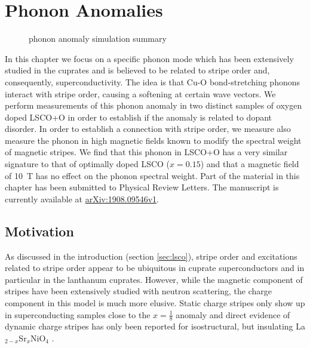 \newcommand{\LSCO}{La$_{2-x}$Sr$_{x}$CuO$_4$}
\newcommand{\LSCOOsix}{La$_{1.94}$Sr$_{0.06}$CuO$_{4+\delta}$}
\newcommand{\LSCOO}{La$_{2-x}$Sr$_{x}$CuO$_{4+\delta}$}
\newcommand{\LCOO}{La$_2$CuO$_{4+\delta}$}
\newcommand{\LNSCO}{La$_{1.48}$Nd$_{0.4}$Sr$_{0.12}$CuO$_4$}
\newcommand{\LSCOTwenty}{La$_{1.80}$Sr$_{0.20}$CuO$_4$}
\newcommand{\LSCOopt}{La$_{1.85}$Sr$_{0.15}$CuO$_4$}
\newcommand{\LSCOseven}{La$_{1.93}$Sr$_{0.07}$CuO$_4$}
\newcommand{\LSCOTwentyfive}{La$_{1.75}$Sr$_{0.25}$CuO$_4$}
\newcommand{\HBCOO}{HgBa$_2$CuO$_{4+\delta}$}
\newcommand{\LBCO}{La$_{2-x}$Ba$_x$CuO$_4$}
\newcommand{\LBCOtwelve}{La$_{1.875}$Ba$_{0.125}$CuO$_4$}
\newcommand{\LCO}{La$_2$CuO$_4$}
\newcommand{\Tc}{$T_\text{c}$}

\chapter{Phonon Anomalies}\label{ch:anomaly}

\begin{figure}
    \centering
    \caption{phonon anomaly simulation summary}
    \label{fig:phonon_anomaly_simulation_summary}
\end{figure}

In this chapter we focus on a specific phonon mode which has been extensively studied in the cuprates and is believed to be related to stripe order and, consequently, superconductivity. The idea is that Cu-O bond-stretching phonons interact with stripe order, causing a softening at certain wave vectors. We perform measurements of this phonon anomaly in two distinct samples of oxygen doped LSCO+O in order to establish if the anomaly is related to dopant disorder. In order to establish a connection with stripe order, we measure also measure the  phonon in high magnetic fields known to modify the spectral weight of magnetic stripes. We find that this phonon in LSCO+O has a very similar signature to that of optimally doped LSCO ($x=0.15$) and that a magnetic field of \SI{10}{\tesla} has no effect on the phonon spectral weight. Part of the material in this chapter has been submitted to Physical Review Letters. The manuscript is currently available at \href{https://arxiv.org/abs/1908.09546v1}{arXiv:1908.09546v1}.

\section{Motivation}
As discussed in the introduction (section \ref{sec:lsco}), stripe order and excitations related to stripe order appear to be ubiquitous in cuprate superconductors and in particular in the lanthanum cuprates. However, while the magnetic component of stripes have been extensively studied with neutron scattering, the charge component in this model is much more elusive. Static charge stripes only show up in superconducting samples close to the $x=\frac{1}{8}$ anomaly \cite{Tranquada1995, Tranquada1996, Christensen2014, Thampy2014, Croft2014} and direct evidence of dynamic charge stripes has only been reported for isostructural, but insulating La$_{2-x}$Sr$_x$NiO$_4$ \cite{Anissimova2014}.


